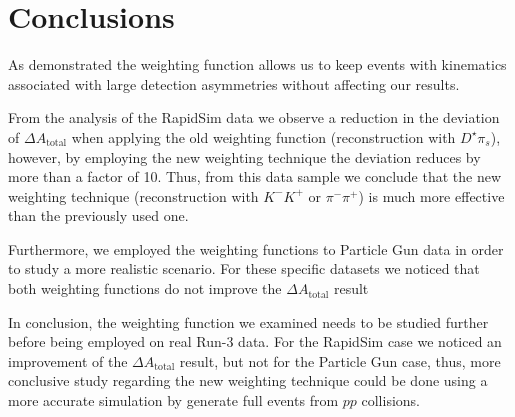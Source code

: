 \documentclass{article}
\begin{document}
        \section{Conclusions}
        As demonstrated the weighting function allows us to keep events with kinematics associated with large detection asymmetries without affecting our results.

        From the analysis of the RapidSim data we observe a reduction in the deviation of $\Delta A_\text{total}$ when applying the old weighting function (reconstruction with $D^\star\pi_s$), however, by employing the new weighting technique the deviation reduces by more than a factor of 10.
        Thus, from this data sample we conclude that the new weighting technique (reconstruction with $K^-K^+ \text{ or } \pi^-\pi^+$) is much more effective than the previously used one.

        Furthermore, we employed the weighting functions to Particle Gun data in order to study a more realistic scenario.
        For these specific datasets we noticed that both weighting functions do not improve the $\Delta A_\text{total}$ result
        

        In conclusion, the weighting function we examined needs to be studied further before being employed on real Run-3 data. 
        For the RapidSim case we noticed an improvement of the $\Delta A_\text{total}$ result, but not for the Particle Gun case, thus, more conclusive study regarding the new weighting technique could be done using a more accurate simulation by generate full events from $pp$ collisions.
        
        \pagebreak
        \nocite{*}
        \printbibliography[notcategory=cited]
\end{document}
